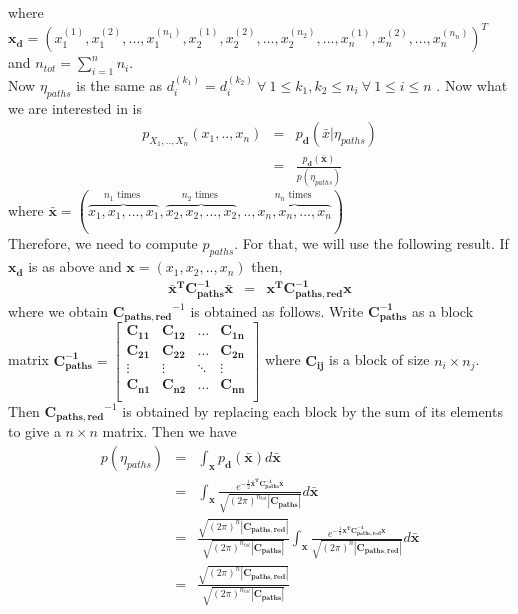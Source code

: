 where $\mathbf{x_d} = ( x_1^{(1)}, x_1^{(2)}, ..., x_1^{(n_1)},x_2^{(1)}, x_2^{(2)}, ..., x_2^{(n_2)},...,x_n^{(1)}, x_n^{(2)}, ..., x_n^{(n_n)}   )^T $ and $n_{tot} = \displaystyle \sum_{i=1}^{n} n_i$. \\
Now $\eta_{paths}$ is the same as $ d_i^{(k_1)} = d_i^{(k_2)} \ \forall \ 1 \leq k_1,k_2 \leq n_i \ \forall \ 1 \leq i \leq n$ . Now what we are interested in is
\begin{eqnarray*}
    p_{X_1,..,X_n}(x_1,..,x_n) &=& p_{\mathbf{d}}(\bar{x} | \eta_{paths}) \\
    &=& \displaystyle \frac{ p_{\mathbf{d}}(\mathbf{\bar{x}} )}{ p(\eta_{paths}) }
\end{eqnarray*}
where $\mathbf{\bar{x}} = ( \overbrace{x_1,x_1,...,x_1}^{n_1\text{ times }}, \overbrace{x_2,x_2,...,x_2}^{n_2\text{ times }},..,\overbrace{x_n,x_n,...,x_n}^{n_n\text{ times }})$\\
Therefore, we need to compute $p_{paths}$. For that, we will use the following result. If $\mathbf{x_d}$ is as above and $\mathbf{x}= (x_1,x_2,..,x_n)$ then,
\begin{eqnarray*}
    \mathbf{\bar{x}^TC_{paths}^{-1}\bar{x}} &=&  \mathbf{x^TC_{paths,red}^{-1}x}
\end{eqnarray*}
where we obtain $\mathbf{C_{paths,red}}^{-1}$ is obtained as follows. Write $\mathbf{C_{paths}^{-1}}$ as a block matrix
$\mathbf{C_{paths}^{-1}} = \begin{bmatrix}
    \mathbf{C_{11}} & \mathbf{C_{12}} & \hdots & \mathbf{C_{1n}} \\
    \mathbf{C_{21}} & \mathbf{C_{22}} & \hdots & \mathbf{C_{2n}} \\
    \vdots & \vdots & \ddots & \vdots \\
    \mathbf{C_{n1}} & \mathbf{C_{n2}} & \hdots & \mathbf{C_{nn}} \\
\end{bmatrix}$
where $\mathbf{C_{ij}}$ is a block of size $n_i \times n_j$. Then $\mathbf{C_{paths,red}}^{-1}$ is obtained by replacing each block by the sum of its elements to give a $n \times n$ matrix. Then we have
\begin{eqnarray*}
    p(\eta_{paths}) &=& \displaystyle \int_{\mathbf{x}} p_{\mathbf{d}}(\mathbf{\bar{x}}) d\mathbf{\bar{x}} \\
    &=& \int_{\mathbf{x}}  \frac{e^{ -\frac{1}{2} \mathbf{\bar{x}^TC_{paths}^{-1}\bar{x}} }}{\sqrt{(2\pi)^{n_{tot}} |\mathbf{C_{paths}}| }}  d\mathbf{\bar{x}}  \\
    &=& \frac{\sqrt{(2\pi)^n |\mathbf{C_{paths,red}}| }}{\sqrt{(2\pi)^{n_{tot}} |\mathbf{C_{paths}}| } } \int_{\mathbf{x}}  \frac{e^{ -\frac{1}{2} \mathbf{x^TC_{paths,red}^{-1}x} }}{\sqrt{(2\pi)^n |\mathbf{C_{paths,red}}| }} d\mathbf{\bar{x}}\\
    &=& \frac{\sqrt{(2\pi)^n |\mathbf{C_{paths,red}}| }}{\sqrt{(2\pi)^{n_{tot}} |\mathbf{C_{paths}}| } }
\end{eqnarray*}
